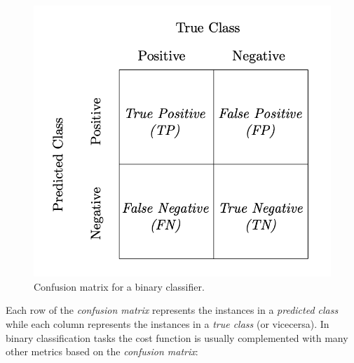\begin{figure}[h]
\centering
\includegraphics[scale=0.5]{sections/Chapters/Chapter2/confusionmatrixdef.png}
\caption{Confusion matrix for a binary classifier.}
\end{figure}

Each row of the \textit{confusion matrix} represents the instances in a \textit{predicted class} while each column represents the instances 
in a \textit{true class} (or vicecersa).
In binary classification tasks the cost function is usually complemented with many other metrics based on the \textit{confusion matrix}:

